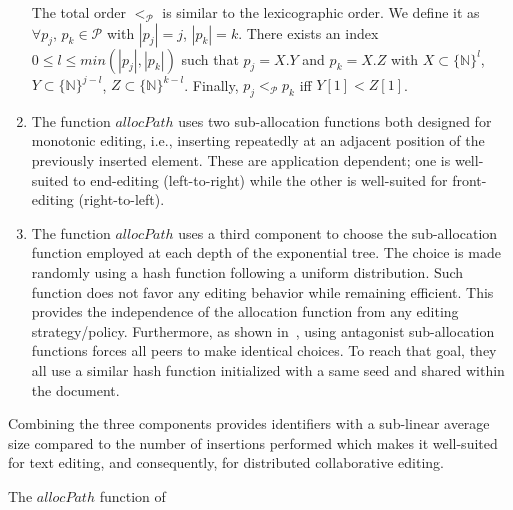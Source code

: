 \begin{asparadesc}
\begin{enumerate}[leftmargin=*]
    The total order $<_{\mathcal{P}}$ is similar to the lexicographic order. We
    define it as $\forall p_j,\,p_k\in\mathcal{P}$ with $|p_j|=j$,
    $|p_k|=k$. There exists an index $0\leq l\leq min(|p_j|,|p_k|)$ such that
    $p_j = X.Y$ and $p_k = X.Z$ with $X\subset \{\mathbb{N}\}^l$,
    $Y \subset \{\mathbb{N}\}^{j-l}$, $Z \subset \{\mathbb{N}\}^{k-l}$. Finally,
    $p_j<_{\mathcal{P}}p_k$ iff $Y[1]<Z[1]$.
  \item The function $allocPath$ uses two sub-allocation functions both designed
    for monotonic editing, i.e., inserting repeatedly at an adjacent position of
    the previously inserted element. These are application dependent; one is
    well-suited to end-editing (left-to-right) while the other is well-suited
    for front-editing (right-to-left).
  \item The function $allocPath$ uses a third component to choose the
    sub-allocation function employed at each depth of the exponential tree. The
    choice is made randomly using a hash function following a uniform
    distribution. Such function does not favor any editing behavior while
    remaining efficient. This provides the independence of the allocation
    function from any editing strategy/policy. Furthermore, as shown
    in~\cite{nedelec2013concurrency}, using antagonist sub-allocation functions
    forces all peers to make identical choices. To reach that goal, they all use
    a similar hash function initialized with a same seed and shared within the
    document.
  \end{enumerate}

  Combining the three components provides identifiers with a sub-linear average
  size compared to the number of insertions performed which makes it well-suited
  for text editing, and consequently, for distributed collaborative editing.
\end{asparadesc}

\begin{algorithm}[h]

\caption{The $allocPath$ function of \LSEQ}
\label{algo:allocpathalgo}
\end{algorithm}

